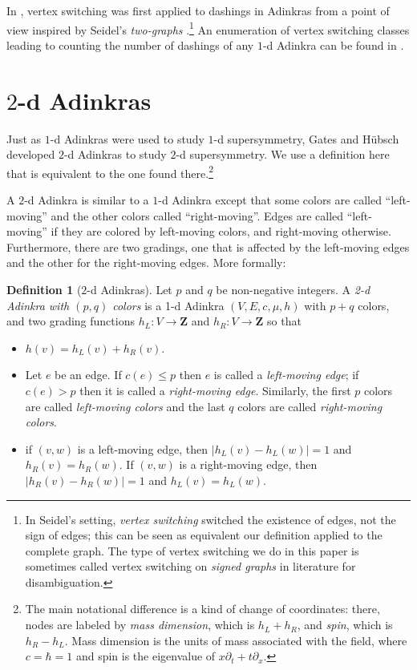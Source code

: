 \documentclass[12pt,twoside,singlespace]{article}
\numberwithin{equation}{section}
\theoremstyle{definition}
\newtheorem{definition}[equation]{Definition}
\newcommand{\ZZ}{\mathbf{Z}}
\begin{document}
In \cite{douglas}, vertex switching was first applied to dashings in Adinkras from a point of view inspired by Seidel's \emph{two-graphs} \cite{seidel:survey}.\footnote{In Seidel's setting, \emph{vertex switching} switched the existence of edges, not the sign of edges; this can be seen as equivalent our definition applied to the complete graph. The type of vertex switching we do in this paper is sometimes called vertex switching on \emph{signed graphs} in literature for disambiguation.} An enumeration of vertex switching classes leading to counting the number of dashings of any $1$-d Adinkra can be found in \cite{zhang:adinkras}.

\section{$2$-d Adinkras}
\label{sec:2d}
Just as $1$-d Adinkras were used to study $1$-d supersymmetry, Gates and H\"ubsch developed $2$-d Adinkras to study $2$-d supersymmetry.\cite{gates:dimensional_extension,hubsch:weaving}  We use a definition here that is equivalent to the one found there.\footnote{The main notational difference is a kind of change of coordinates: there, nodes are labeled by \emph{mass dimension}, which is $h_L+h_R$, and \emph{spin}, which is $h_R-h_L$.  Mass dimension is the units of mass associated with the field, where $c=\hbar=1$ and spin is the eigenvalue of $x\partial_t+t \partial_x$.}


A $2$-d Adinkra is similar to a $1$-d Adinkra except that some colors are called ``left-moving'' and the other colors called ``right-moving''.  Edges are called ``left-moving'' if they are colored by left-moving colors, and right-moving otherwise.  Furthermore, there are two gradings, one that is affected by the left-moving edges and the other for the right-moving edges. More formally:
\begin{definition}[$2$-d Adinkras]
Let $p$ and $q$ be non-negative integers. A \emph{2-d Adinkra with $(p,q)$ colors} is a 1-d Adinkra $(V,E,c,\mu,h)$ with $p+q$ colors, and two grading functions $h_L:V\to \ZZ$ and $h_R:V\to \ZZ$ so that
\begin{itemize}
\item $h(v)=h_L(v)+h_R(v)$.
\item Let $e$ be an edge.  If $c(e)\le p$ then $e$ is called a \emph{left-moving edge}; if $c(e)>p$ then it is called a \emph{right-moving edge}. Similarly, the first $p$ colors are called \emph{left-moving colors} and the last $q$ colors are called \emph{right-moving colors}.
\item if $(v,w)$ is a left-moving edge, then $|h_L(v)-h_L(w)|=1$ and $h_R(v)=h_R(w)$.  If $(v,w)$ is a right-moving edge, then $|h_R(v)-h_R(w)|=1$ and $h_L(v)=h_L(w)$.
\end{itemize}
\end{definition}
\end{document}
